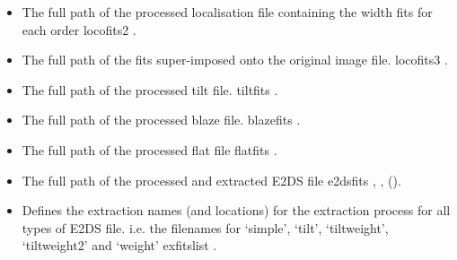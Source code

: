 \begin{itemize}
	\item {} 
	{The full path of the processed localisation file containing the width fits for each order}
	{locofits2}
	{\callocRAW}{\spirouConst.}{\callocRAW}
\end{itemize}

\begin{itemize}
	\item {} 
	{The full path of the fits super-imposed onto the original image file.}
	{locofits3}
	{\callocRAW}{\spirouConst.}{\callocRAW}
\end{itemize}

\begin{itemize}
	\item {} 
	{The full path of the processed tilt file.}
	{tiltfits}
	{\calSLIT}{\spirouConst.}{\calSLIT}
\end{itemize}

\begin{itemize}
	\item {} 
	{The full path of the processed blaze file.}
	{blazefits}
	{\calFFraw}{\spirouConst.}{\calFFraw}
\end{itemize}


\begin{itemize}
	\item {} 
	{The full path of the processed flat file}
	{flatfits}
	{\calFFraw}{\spirouConst.}{\calFFraw}
\end{itemize}


\begin{itemize}
	\item {} 
	{The full path of the processed and extracted E2DS file}
	{e2dsfits}
	{\calextractRAW, \calextractRAWAB, \calextractRAWC()}{\spirouConst.}{\calextractRAW}
\end{itemize}


\begin{itemize}
	\item {} 
	{Defines the extraction names (and locations) for the extraction process for all types of E2DS file. i.e. the filenames for `simple', `tilt', `tiltweight', `tiltweight2' and `weight'}
	{exfitslist}
	{\calextractRAW}{\spirouConst.}{\calextractRAW}
\end{itemize}


